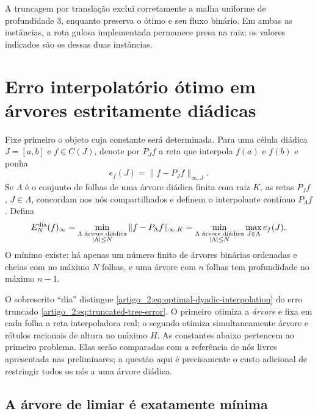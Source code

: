 A truncagem por translação exclui corretamente a malha uniforme de
profundidade $3$, enquanto preserva o ótimo e seu fluxo binário. Em ambas as
instâncias, a rota gulosa implementada permanece presa na raiz; os valores indicados são os dessas duas instâncias.

\section{Erro interpolatório ótimo em árvores estritamente diádicas}
\label{artigo_2:sec:dyadic-asymptotic}

Fixe primeiro o objeto cuja constante será determinada. Para uma célula
diádica $J=[a,b]$ e $f\in C(J)$, denote por $P_Jf$ a reta que interpola
$f(a)$ e $f(b)$ e ponha
\begin{equation}
 e_f(J)=\|f-P_Jf\|_{\infty,J}.
 \label{artigo_2:eq:local-interpolation-error}
\end{equation}
Se $\Lambda$ é o conjunto de folhas de uma árvore diádica finita com raiz
$K$, as retas $P_Jf$, $J\in\Lambda$, concordam nos nós compartilhados e
definem o interpolante contínuo $P_\Lambda f$. Defina
\begin{equation}
 E_N^{\rm dia}(f)_\infty
 =\min_{\substack{\Lambda\text{ árvore diádica}\\ |\Lambda|\le N}}
   \|f-P_\Lambda f\|_{\infty,K}
 =\min_{\substack{\Lambda\text{ árvore diádica}\\ |\Lambda|\le N}}
   \max_{J\in\Lambda}e_f(J).
 \label{artigo_2:eq:optimal-dyadic-interpolation}
\end{equation}
O mínimo existe: há apenas um número finito de árvores binárias ordenadas e
cheias com no máximo $N$ folhas, e uma árvore com $n$ folhas tem profundidade
no máximo $n-1$.

O sobrescrito ``dia'' distingue \eqref{artigo_2:eq:optimal-dyadic-interpolation} do
erro truncado \eqref{artigo_2:eq:truncated-tree-error}. O primeiro otimiza a
\emph{árvore} e fixa em cada folha a reta interpoladora real; o segundo
otimiza simultaneamente árvore e rótulos racionais de altura no máximo $H$.
As constantes abaixo pertencem ao primeiro problema.
Elas serão comparadas com a referência de nós livres apresentada nas preliminares; a questão aqui é precisamente o custo adicional de
restringir todos os nós a uma árvore diádica.

\subsection{A árvore de limiar é exatamente mínima}

